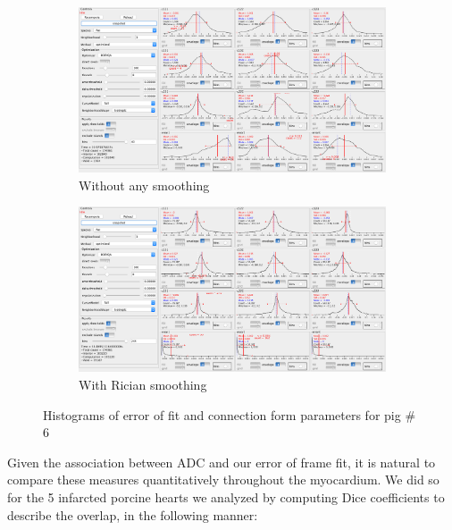 \begin{figure}
    \centering
    \begin{subfigure}{1\textwidth}
        \centering
        \includegraphics[width=\textwidth]{figures/histogram_pig6_no_smooth}
        \caption{Without any smoothing}
        \label{fig:histogram_pig6_no_smooth}
    \end{subfigure}
    \begin{subfigure}{1\textwidth}
        \centering
        \includegraphics[width=\textwidth]{figures/histogram_pig6_smooth}
        \caption{With Rician smoothing}
        \label{fig:histogram_pig6_smooth}
    \end{subfigure}
    \caption{Histograms of error of fit and connection form parameters for pig \# 6}
    \label{histo_pig6}
\end{figure}

Given the association between ADC and our error of frame fit, it is natural to compare these measures quantitatively throughout the myocardium. We did so for the 5 infarcted porcine hearts we analyzed by computing Dice coefficients to describe the overlap, in the following manner:

